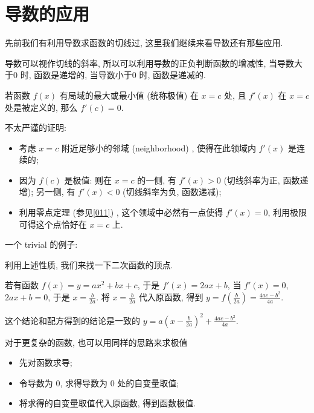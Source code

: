 \section{导数的应用}\label{015}

先前我们有利用导数求函数的切线过, 这里我们继续来看导数还有那些应用.

\begin{tcolorbox}[size=fbox, breakable, enhanced jigsaw, title={一次导和极值}]

导数可以视作切线的斜率, 所以可以利用导数的正负判断函数的增减性,
当导数大于$0$ 时, 函数是递增的, 当导数小于$0$ 时, 函数是递减的.

若函数 $f(x)$ 有局域的最大或最小值 (统称极值) 在 $x=c$ 处, 且
$f'(x)$ 在 $x=c$ 处是被定义的, 那么 $f'(c)=0$.

\begin{newquote}
不太严谨的证明:

\begin{itemize}

\item
  考虑 $x=c$ 附近足够小的邻域 (neighborhood) , 使得在此领域内
  $f'(x)$ 是连续的;
\item
  因为 $f(c)$ 是极值: 则在 $x=c$ 的一侧, 有 $f'(x)>0$
  (切线斜率为正, 函数递增); 另一侧, 有 $f'(x)<0$ (切线斜率为负,
  函数递减);
\item
  利用零点定理 (参见\ref{011}) , 这个领域中必然有一点使得 $f'(x)=0$,
  利用极限可得这个点恰好在 $x=c$ 上.
\end{itemize}
\end{newquote}

\begin{newquote}
一个 trivial 的例子:

利用上述性质, 我们来找一下二次函数的顶点.

若有函数 $f(x)=y=ax^2+bx+c$, 于是 $f'(x)=2ax+b$, 当 $f'(x)=0$,
$2ax+b=0$, 于是 $x=\frac{b}{2a}$. 将 $x=\frac{b}{2a}$ 代入原函数,
得到 $y=f\left(\frac{b}{2a}\right)=\frac{4ac-b^2}{4a}$.

这个结论和配方得到的结论是一致的
$y=a\left(x-\frac{b}{2a}\right)^2+\frac{4ac-b^2}{4a}$.
\end{newquote}

对于更复杂的函数, 也可以用同样的思路来求极值

\begin{itemize}

\item
  先对函数求导;
\item
  令导数为 $0$, 求得导数为 $0$ 处的自变量取值;
\item
  将求得的自变量取值代入原函数, 得到函数极值.
\end{itemize}

\end{tcolorbox}

